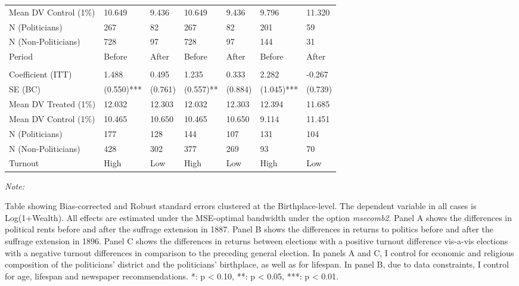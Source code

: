 \begin{table}[!h]
{\begin{threeparttable}
\begin{tabular}[t]{lllllll}
\hspace{1em}Mean DV Control (1\%) & 10.649 & 9.436 & 10.649 & 9.436 & 9.796 & 11.320\\
\hspace{1em}N (Politicians) & 267 & 82 & 267 & 82 & 201 & 59\\
\hspace{1em}N (Non-Politicians) & 728 & 97 & 728 & 97 & 144 & 31\\
\hspace{1em}Period & Before & After & Before & After & Before & After\\
\addlinespace[0.3em]
\multicolumn{7}{l}{\textbf{High and Low Turnout}}\\
\hspace{1em}Coefficient (ITT) & 1.488 & 0.495 & 1.235 & 0.333 & 2.282 & -0.267\\
\hspace{1em}SE (BC) & (0.550)*** & (0.761) & (0.557)** & (0.884) & (1.045)*** & (0.739)\\
\hspace{1em}Mean DV Treated (1\%) & 12.032 & 12.303 & 12.032 & 12.303 & 12.394 & 11.685\\
\hspace{1em}Mean DV Control (1\%) & 10.465 & 10.650 & 10.465 & 10.650 & 9.114 & 11.451\\
\hspace{1em}N (Politicians) & 177 & 128 & 144 & 107 & 131 & 104\\
\hspace{1em}N (Non-Politicians) & 428 & 302 & 377 & 269 & 93 & 70\\
\hspace{1em}Turnout & High & Low & High & Low & High & Low\\
\bottomrule
\end{tabular}
\begin{tablenotes}[para]
\item \textit{Note: } 
\item Table showing Bias-corrected and Robust standard errors clustered at the Birthplace-level. The dependent variable in all cases is Log(1+Wealth). All effects are estimated under the MSE-optimal bandwidth under the option \textit{msecomb2}. Panel A shows the differences in political rents before and after the suffrage extension in 1887. Panel B shows the differences in returns to politics before and after the suffrage extension in 1896. Panel C shows the differences in returns between elections with a positive turnout difference vis-a-vis elections with a negative turnout differences in comparison to the preceding general election. In panels A and C, I control for economic and religious composition of the politicians' district and the politicians' birthplace, as well as for lifespan. In panel B, due to data constraints, I control for age, lifespan and newspaper recommendations. *: p < 0.10, **: p < 0.05, ***: p < 0.01.
\end{tablenotes}
\end{threeparttable}}
\end{table}
